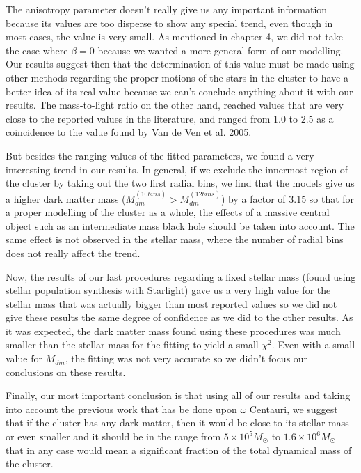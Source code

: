 The anisotropy parameter doesn't really give us any important information because its values are too disperse to show any special trend, even though in most cases, the value is very small. As mentioned in chapter 4, we did not take the case where $\beta = 0$ because we wanted a more general form of our modelling. Our results suggest then that the determination of this value must be made using other methods regarding the proper motions of the stars in the cluster to have a better idea of its real value because we can't conclude anything about it with our results. The mass-to-light ratio on the other hand, reached values that are very close to the reported values in the literature, and ranged from 1.0 to 2.5 as a coincidence to the value found by Van de Ven et al. 2005.

But besides the ranging values of the fitted parameters, we found a very interesting trend in our results. In general, if we exclude the innermost region of the cluster by taking out the two first radial bins, we find that the models give us a higher dark matter mass ($M_{dm}^{(10 bins)}>M_{dm}^{(12 bins)}$) by a factor of 3.15 so that for a proper modelling of the cluster as a whole, the effects of a massive central object such as an intermediate mass black hole should be taken into account. The same effect is not observed in the stellar mass, where the number of radial bins does not really affect the trend.

Now, the results of our last procedures regarding a fixed stellar mass (found using stellar population synthesis with Starlight) gave us a very high value for the stellar mass that was actually bigger than most reported values so we did not give these results the same degree of confidence as we did to the other results. As it was expected, the dark matter mass found using these procedures was much smaller than the stellar mass for the fitting to yield a small $\chi^{2}$. Even with a small value for $M_{dm}$, the fitting was not very accurate so we didn't focus our conclusions on these results.

Finally, our most important conclusion is that using all of our results and taking into account the previous work that has be done upon $\omega$ Centauri, we suggest that if the cluster has any dark matter, then it would be close to its stellar mass or even smaller and it should be in the range from $5 \times 10^{5} M_{\odot}$ to $1.6 \times 10^{6} M_{\odot}$ that in any case would mean a significant fraction of the total dynamical mass of the cluster. 

